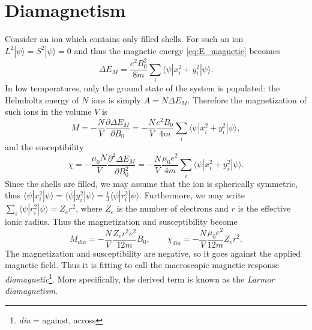 \section{Diamagnetism}
Consider an ion which contains only filled shells. For such an ion $L^2|\psi\rangle = S^2|\psi\rangle = 0$ and thus the magnetic energy \eqref{eq:E_magnetic} becomes
\begin{equation}
\Delta E_M = \frac{e^2 B_0^2}{8 m}\sum_i \langle \psi | x_i^2 + y_i^2 | \psi \rangle.
\end{equation}
In low temperatures, only the ground state of the system is populated: the Helmholtz energy of $N$ ions is simply $A = N\Delta E_M$. Therefore the magnetization of such ions in the volume $V$ is
\begin{equation}
M = -\frac{N}{V}\frac{\partial \Delta E_M}{\partial B_0}
= -\frac{N}{V} \frac{e^2 B_0}{4 m} \sum_i \langle \psi | x_i^2 + y_i^2 | \psi \rangle,
\end{equation}
and the susceptibility
\begin{equation}
\chi = -\frac{\mu_0 N}{V} \frac{\partial^2 \Delta E_M}{\partial B_0^2}
= -\frac{N}{V} \frac{\mu_0 e^2}{4 m}\sum_i \langle \psi | x_i^2 + y_i^2 | \psi \rangle.
\end{equation}
Since the shells are filled, we may assume that the ion is spherically symmetric, thus $\langle \psi | x_i^2| \psi \rangle = \langle \psi | y_i^2 | \psi \rangle = \frac{1}{3} \langle \psi | r_i^2| \psi \rangle $. Furthermore, we may write $\sum_i \langle \psi | r_i^2| \psi \rangle = Z_{e} r^2$, where $Z_{e}$ is the number of electrons and $r$ is the effective ionic radius. Thus the magnetization and susceptibility become
\begin{equation}
M_{dia} = - \frac{N}{V} \frac{Z_e  r^2 e^2}{12 m} B_0, 
\qquad
\chi_{dia} =  -\frac{N}{V} \frac{\mu_0  e^2}{12 m} Z_{e} r^2.
\end{equation}
The magnetization and susceptibility are negative, so it goes against the applied magnetic field. Thus it is fitting to call the macroscopic magnetic response \emph{diamagnetic}\footnote{\emph{dia} = against, across}. More specifically, the derived term is known as the \emph{Larmor diamagnetism}.

